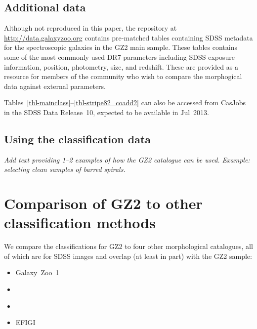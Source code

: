 \documentclass[useAMS,usenatbib]{mn2e}
\begin{document}
\subsection{Additional data}\label{ssec-metadata}

Although not reproduced in this paper, the repository at \url{http://data.galaxyzoo.org} contains pre-matched tables containing SDSS metadata for the spectroscopic galaxies in the GZ2 main sample. These tables contains some of the most commonly used DR7 parameters including SDSS exposure information, position, photometry, size, and redshift. These are provided as a resource for members of the community who wish to compare the morphogical data against external parameters. 

Tables~\ref{tbl-mainclass}--\ref{tbl-stripe82_coadd2} can also be accessed from CasJobs in the SDSS Data Release~10, expected to be available in Jul~2013. 

\subsection{Using the classification data}\label{ssec-usingdata}

{\it Add text providing 1--2 examples of how the GZ2 catalogue can be used. Example: selecting clean samples of barred spirals.}


\section{Comparison of GZ2 to other classification methods}\label{sec-comparison}

We compare the classifications for GZ2 to four other morphological catalogues, all of which are for SDSS images and overlap (at least in part) with the GZ2 sample:

\begin{itemize}
	\item Galaxy~Zoo~1 \citep{lin11}
	\item \citet{nai10}
	\item \citet{hue11}
	\item EFIGI \citep{bai11}
\end{itemize}

\end{document}
